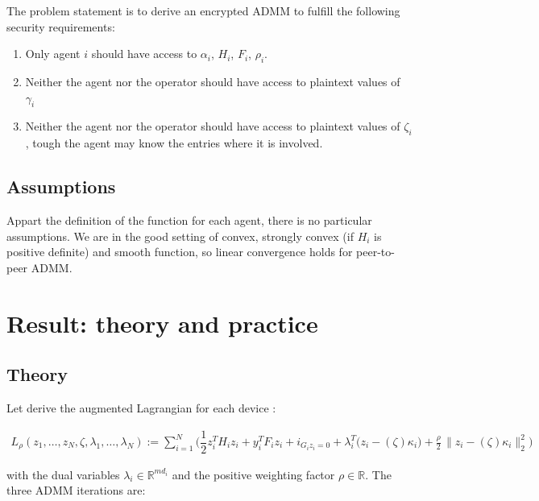 \documentclass[10pt,english]{article}
\begin{document}
The problem statement is to derive an  encrypted ADMM to fulfill the following security requirements:

\begin{enumerate}
    \item Only agent $i$ should have access to $\alpha_i$, $H_i$, $F_i$, $\rho_i$.
    \item Neither the agent nor the operator should have access to plaintext values of $\gamma_i$
    \item Neither the agent nor the operator should have access to plaintext values of $\zeta_i$, tough the agent may know the entries where it is involved.
\end{enumerate}


\subsection{Assumptions}


Appart the definition of the function for each agent, there is no particular assumptions. We are in the 
good setting of convex, strongly convex (if $H_i$ is positive definite) and smooth function, so linear convergence
holds for peer-to-peer ADMM.


\section{Result: theory and practice}

\subsection{Theory}


Let derive the augmented Lagrangian for each device : 

\begin{align}\label{Lagragian}
L_\rho(z_1,\ldots,z_N,\zeta,\lambda_1,\ldots,\lambda_N)
:=
\sum_{i=1}^{N}
\Big(
\dfrac{1}{2}z_i^TH_iz_i + y_i^TF_iz_i + i_{G_iz_i=0}
+ \lambda_i^{T}\big(z_i - (\zeta)\kappa_i\big)
+ \frac{\rho}{2}\,\| z_i - (\zeta)\kappa_i \|_2^2
\Big)
\end{align}

with the dual variables $\lambda_i \in \mathbb{R}^{md_i}$ and the positive weighting factor $\rho \in \mathbb{R}$. The three ADMM iterations are:
\end{document}
